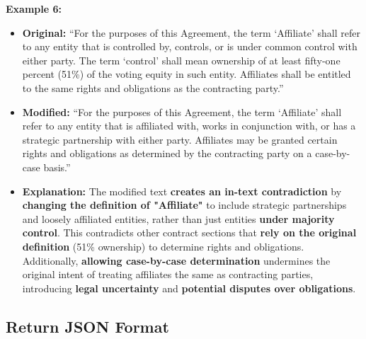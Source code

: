 \documentclass[11pt]{article}
\begin{document}
\begin{tcolorbox}[breakable,colback=lightestgray,colframe=black,title=\textbf{Inconsistency In-Text Data Generation Prompt}]
\textbf{Example 6:}
        \begin{itemize}
    \item \textbf{Original:} ``For the purposes of this Agreement, the term `Affiliate' shall refer to any entity that is controlled by, controls, or is under common control with either party. The term `control' shall mean ownership of at least fifty-one percent (51\%) of the voting equity in such entity. Affiliates shall be entitled to the same rights and obligations as the contracting party.''
    \item \textbf{Modified:} ``For the purposes of this Agreement, the term `Affiliate' shall refer to any entity that is affiliated with, works in conjunction with, or has a strategic partnership with either party. Affiliates may be granted certain rights and obligations as determined by the contracting party on a case-by-case basis.''
    \item \textbf{Explanation:} The modified text \textbf{creates an in-text contradiction} by \textbf{changing the definition of "Affiliate"} to include strategic partnerships and loosely affiliated entities, rather than just entities \textbf{under majority control}. This contradicts other contract sections that \textbf{rely on the original definition} (51\% ownership) to determine rights and obligations. Additionally, \textbf{allowing case-by-case determination} undermines the original intent of treating affiliates the same as contracting parties, introducing \textbf{legal uncertainty} and \textbf{potential disputes over obligations}.
\end{itemize}

\subsection*{\textbf{Return JSON Format}}


\end{tcolorbox}
\end{document}
